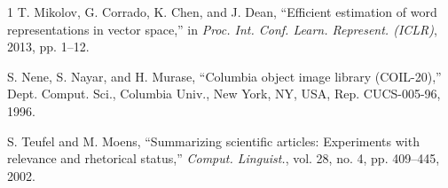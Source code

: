 \documentclass[10pt,twocolumn]{IEEEtran}
\begin{document}
\begin{thebibliography}{1}
		T. Mikolov, G. Corrado, K. Chen, and J. Dean, ``Efficient estimation of word representations in vector space,'' in \emph{Proc. Int. Conf. Learn. Represent. (ICLR)}, 2013, pp. 1--12.
		
		S. Nene, S. Nayar, and H. Murase, ``Columbia object image library (COIL-20),'' Dept. Comput. Sci., Columbia Univ., New York, NY, USA, Rep. CUCS-005-96, 1996.
		
		S. Teufel and M. Moens, ``Summarizing scientific articles: Experiments with relevance and rhetorical status,'' \emph{Comput. Linguist.}, vol. 28, no. 4, pp. 409--445, 2002.
		
	\end{thebibliography}
	
\end{document}
